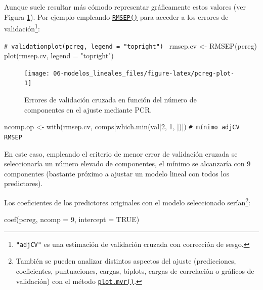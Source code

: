 \documentclass[
]{book}
\newenvironment{Shaded}{\begin{snugshade}}{\end{snugshade}}
\newcommand{\AttributeTok}[1]{\textcolor[rgb]{0.77,0.63,0.00}{#1}}
\newcommand{\CommentTok}[1]{\textcolor[rgb]{0.56,0.35,0.01}{\textit{#1}}}
\newcommand{\ConstantTok}[1]{\textcolor[rgb]{0.00,0.00,0.00}{#1}}
\newcommand{\DecValTok}[1]{\textcolor[rgb]{0.00,0.00,0.81}{#1}}
\newcommand{\FunctionTok}[1]{\textcolor[rgb]{0.00,0.00,0.00}{#1}}
\newcommand{\NormalTok}[1]{#1}
\newcommand{\OtherTok}[1]{\textcolor[rgb]{0.56,0.35,0.01}{#1}}
\newcommand{\StringTok}[1]{\textcolor[rgb]{0.31,0.60,0.02}{#1}}
\theoremstyle{break}
\theoremstyle{nonumberplain}
\renewcommand{\CommentTok}[1]{\textcolor[rgb]{0.41,0.41,0.41}{\texttt{#1}}}
\begin{document}
Aunque suele resultar más cómodo representar gráficamente estos valores (ver Figura \ref{fig:pcreg-plot}).
Por ejemplo empleando \href{https://rdrr.io/pkg/pls/man/mvrVal.html}{\texttt{RMSEP()}} para acceder a los errores de validación\footnote{\texttt{"adjCV"} es una estimación de validación cruzada con corrección de sesgo.}:

\begin{Shaded}
\begin{Highlighting}[]
\CommentTok{\# validationplot(pcreg, legend = "topright") }
\NormalTok{rmsep.cv }\OtherTok{\textless{}{-}} \FunctionTok{RMSEP}\NormalTok{(pcreg)}
\FunctionTok{plot}\NormalTok{(rmsep.cv, }\AttributeTok{legend =} \StringTok{"topright"}\NormalTok{)}
\end{Highlighting}
\end{Shaded}

\begin{figure}[!htb]

{\centering \texttt{[image: 06-modelos\_lineales\_files/figure-latex/pcreg-plot-1]} 

}

\caption{Errores de validación cruzada en función del número de componentes en el ajuste mediante PCR.}\label{fig:pcreg-plot}
\end{figure}

\begin{Shaded}
\begin{Highlighting}[]
\NormalTok{ncomp.op }\OtherTok{\textless{}{-}} \FunctionTok{with}\NormalTok{(rmsep.cv, comps[}\FunctionTok{which.min}\NormalTok{(val[}\DecValTok{2}\NormalTok{, }\DecValTok{1}\NormalTok{, ])]) }\CommentTok{\# mínimo adjCV RMSEP}
\end{Highlighting}
\end{Shaded}

En este caso, empleando el criterio de menor error de validación cruzada se seleccionaría un número elevado de componentes, el mínimo se alcanzaría con 9 componentes (bastante próximo a ajustar un modelo lineal con todos los predictores).

Los coeficientes de los predictores originales con el modelo seleccionado serían\footnote{También se pueden analizar distintos aspectos del ajuste (predicciones, coeficientes, puntuaciones, cargas, biplots, cargas de correlación o gráficos de validación) con el método \href{https://rdrr.io/pkg/pls/man/plot.mvr.html}{\texttt{plot.mvr()}}.}:

\begin{Shaded}
\begin{Highlighting}[]
\FunctionTok{coef}\NormalTok{(pcreg, }\AttributeTok{ncomp =} \DecValTok{9}\NormalTok{, }\AttributeTok{intercept =} \ConstantTok{TRUE}\NormalTok{)}
\end{Highlighting}
\end{Shaded}
\end{document}
